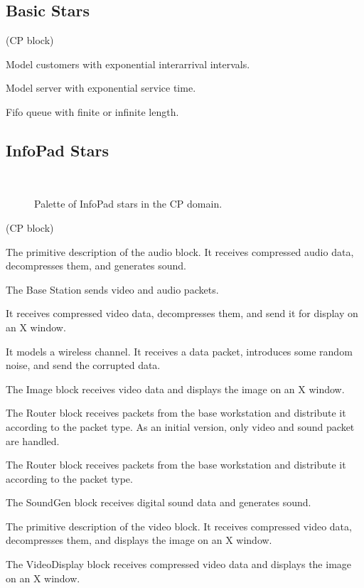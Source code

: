 \subsection{Basic Stars}

\begin{blocklist}{(CP block)}

Model customers with exponential interarrival intervals.

Model server with exponential service time.

Fifo queue with finite or infinite length.

\end{blocklist}

\subsection{InfoPad Stars}

\begin{figure}
\begin{center}
\ 
\end{center}
\caption{Palette of InfoPad stars in the CP domain.}
\label{figure CP infopad stars}
\end{figure}

\begin{blocklist}{(CP block)}

The primitive description of the audio block.
It receives compressed audio data, decompresses them, 
and generates sound.

The Base Station sends video and audio packets.

It receives compressed video data, decompresses
them, and send it for display on an X window.

It models a wireless channel.
It receives a data packet, introduces some random noise, 
and send the corrupted data.

The Image block receives video data and displays 
the image on an X window.

The Router block receives packets from the base workstation
and distribute it according to the packet type.
As an initial version, only video and sound packet are 
handled.

The Router block receives packets from the base workstation
and distribute it according to the packet type.

The SoundGen block receives digital sound data and generates sound.

The primitive description of the video block.
It receives compressed video data, decompresses
them, and displays the image on an X window.

The VideoDisplay block receives compressed video data and displays 
the image on an X window.

\end{blocklist}

